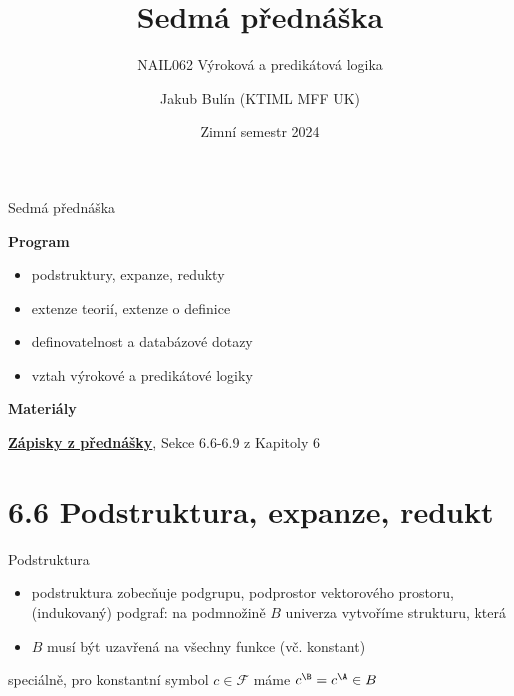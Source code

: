\documentclass{beamer}
\title{Sedmá přednáška}
\subtitle{NAIL062 Výroková a predikátová logika}
\author{Jakub Bulín (KTIML MFF UK)}
\date{Zimní semestr 2024}
\begin{document}
\maketitle


\begin{frame}{Sedmá přednáška}

    \textbf{Program}
        \begin{itemize}
            \item podstruktury, expanze, redukty           
            \item extenze teorií, extenze o definice
            \item definovatelnost a databázové dotazy
            \item vztah výrokové a predikátové logiky
        \end{itemize}

    \textbf{Materiály}

        \href{https://github.com/jbulin-mff-uk/nail062/raw/main/lecture/lecture-notes/lecture-notes.pdf}{\alert{\textbf{Zápisky z přednášky}}}, Sekce 6.6-6.9 z Kapitoly 6

\end{frame}


\section{6.6 Podstruktura, expanze, redukt}


\begin{frame}{Podstruktura}

    \begin{itemize}
        \item \alert{podstruktura} zobecňuje podgrupu, podprostor vektorového prostoru, (indukovaný) podgraf: na podmnožině $B$ univerza vytvoříme strukturu, která 
        \item $B$ musí být \alert{uzavřená} na všechny funkce (vč. konstant)
    \end{itemize}


    speciálně, pro konstantní symbol $c\in\mathcal F$ máme $c^\B=c^\A\in B$
    


\end{frame}
\end{document}
